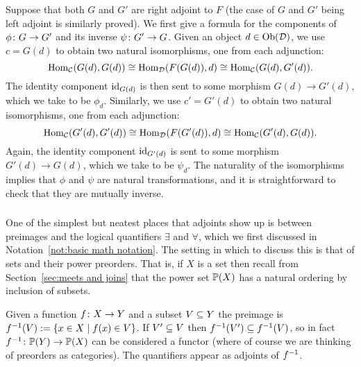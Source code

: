 \documentclass[CT4S-EN-RU]{subfiles}
\begin{document}
\begin{proofENG}
Suppose that both $G$ and $G'$ are right adjoint to $F$ (the case of $G$ and $G'$ being left adjoint is similarly proved). We first give a formula for the components of $\phi\taking G\to G'$ and its inverse $\psi\taking G'\to G$. Given an object $d\in\Ob(\mcD)$, we use $c=G(d)$ to obtain two natural isomorphisms, one from each adjunction: 
$$\Hom_\mcC(G(d),G(d))\iso\Hom_\mcD(F(G(d)),d)\iso\Hom_\mcC(G(d),G'(d)).$$
The identity component $\id_{G(d)}$ is then sent to some morphism $G(d)\to G'(d)$, which we take to be $\phi_d$. Similarly, we use $c'=G'(d)$ to obtain two natural isomorphisms, one from each adjunction:
$$\Hom_\mcC(G'(d),G'(d))\iso\Hom_\mcD(F(G'(d)),d)\iso\Hom_\mcC(G'(d),G(d)).$$
Again, the identity component $\id_{G'(d)}$ is sent to some morphism $G'(d)\to G(d)$, which we take to be $\psi_d$. The naturality of the isomorphisms implies that $\phi$ and $\psi$ are natural transformations, and it is straightforward to check that they are mutually inverse.
\end{proofENG}

\begin{proofRUS}
\end{proofRUS}


\subsubsection{}

\begin{blockENG}
One of the simplest but neatest places that adjoints show up is between preimages and the logical quantifiers $\exists$ and $\forall$, which we first discussed in Notation~\ref{not:basic math notation}.  The setting in which to discuss this is that of sets and their power preorders. That is, if $X$ is a set then recall from Section~\ref{sec:meets and joins} that the power set $\PP(X)$ has a natural ordering by inclusion of subsets. 
\end{blockENG}

\begin{blockRUS}
\end{blockRUS}

\begin{blockENG}
Given a function $f\taking X\to Y$ and a subset $V\ss Y$ the preimage is $f^\m1(V):=\{x\in X\|f(x)\in V\}$. If $V'\ss V$ then $f^\m1(V')\ss f^\m1(V)$, so in fact $f^\m1\taking\PP(Y)\to\PP(X)$ can be considered a functor (where of course we are thinking of preorders as categories). The quantifiers appear as adjoints of $f^\m1$.
\end{blockENG}
\end{document}
